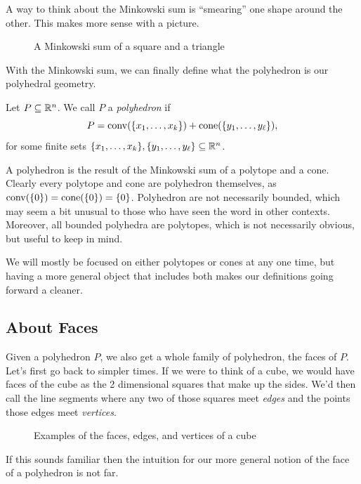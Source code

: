\documentclass[12pt,oneside]{../../sfsuthesis}
\begin{document}
A way to think about the Minkowski sum is ``smearing'' one shape around the other.
This makes more sense with a picture.
\begin{figure}[H]
    \centering
    \caption{A Minkowski sum of a square and a triangle}
\end{figure}

With the Minkowski sum, we can finally define what the polyhedron is our polyhedral geometry.
\begin{definition}[Polyhedron]\th\def{def:polyhedron}
    Let \( P \subseteq \R^n \). We call \( P \) a \emph{polyhedron} if
    \[
        P = \operatorname{conv}(\{x_1, \dots, x_k\}) + \mathrm{cone}(\{y_1, \dots, y_\ell\}),
    \]
    for some finite sets \( \{x_1, \dots, x_k\}, \{y_1, \dots, y_\ell\} \subseteq \mathbb{R}^n \).
\end{definition}
A polyhedron is the result of the Minkowski sum of a polytope and a cone.
Clearly every polytope and cone are polyhedron themselves, as \( \operatorname{conv}(\{0\}) = \mathrm{cone}(\{0\}) = \{ 0 \} \).
Polyhedron are not necessarily bounded, which may seem a bit unusual to those who have seen the word in other contexts.
Moreover, all bounded polyhedra are polytopes, which is not necessarily obvious, but useful to keep in mind.
\begin{figure}[H]
    \centering
\end{figure}
We will mostly be focused on either polytopes or cones at any one time, but having a more general object that includes both makes our definitions going forward a cleaner.

\subsection{About Faces}
Given a polyhedron \( P \), we also get a whole family of polyhedron, the faces of \( P \).
Let's first go back to simpler times.
If we were to think of a cube, we would have faces of the cube as the 2 dimensional squares that make up the sides.
We'd then call the line segments where any two of those squares meet \textit{edges} and the points those edges meet \textit{vertices}.
\begin{figure}[H]
    \centering
    \caption{Examples of the faces, edges, and vertices of a cube}
\end{figure}
If this sounds familiar then the intuition for our more general notion of the face of a polyhedron is not far.
\end{document}
